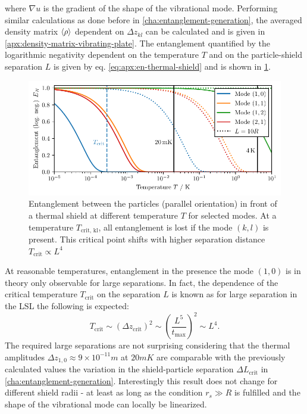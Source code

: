 where $\nabla u$ is the gradient of the shape of the vibrational mode.
Performing similar calculations as done before in \cref{cha:entanglement-generation}, the averaged density matrix $\left\langle\rho\right\rangle$ dependent on $\Delta z_{kl}$ can be calculated and is given in \cref{apx:density-matrix-vibrating-plate}.
The entanglement quantified by the logarithmic negativity dependent on the temperature $T$ and on the particle-shield separation $L$ is given by eq. \eqref{eq:apx:en-thermal-shield} and is shown in \cref{fig:5:entanglement-temperature}.
\begin{figure}[!htbp]
  \centering
  \includegraphics[width=\textwidth]{./../figures/vibrations/log-neg-shield-vibrations-T.pdf}
  \caption{Entanglement between the particles (parallel orientation) in front of a thermal shield at different temperature $T$ for selected modes. At a temperature $T_\mathrm{crit,\,kl}$, all entanglement is lost if the mode $(k,l)$ is present. This critical point shifts with higher separation distance $T_\mathrm{crit}\propto L^4$}
  \label{fig:5:entanglement-temperature}
\end{figure}
At reasonable temperatures, entanglement in the presence the mode $(1,0)$ is in theory only observable for large separations.
In fact, the dependence of the critical temperature $T_\mathrm{crit}$ on the separation $L$ is known as for large separation in the LSL the following is expected:
\begin{equation}
  T_\mathrm{crit} \sim (\Delta z_\mathrm{crit})^2 \sim \left(\frac{L^5}{t_\mathrm{max}} \right)^2 \sim L^4 .
\end{equation}
The required large separations are not surprising considering that the thermal amplitudes $\Delta z_{1,0} \approx 9 \times 10^{-11}\si{m}$ at $20\si{mK}$ are comparable with the previously calculated values the variation in the shield-particle separation $\Delta L_\mathrm{crit}$ in \cref{cha:entanglement-generation}.
Interestingly this result does not change for different shield radii - at least as long as the condition $r_s \gg R$ is fulfilled and the shape of the vibrational mode can locally be linearized.
